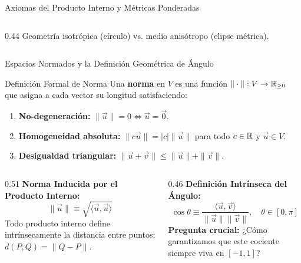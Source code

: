 \documentclass[10pt,aspectratio=169]{beamer}
\begin{document}
\begin{frame}{Axiomas del Producto Interno y Métricas Ponderadas}
\begin{columns}[c]
\begin{column}{0.44\textwidth}
      {\scriptsize Geometría isotrópica (círculo) vs. medio anisótropo (elipse métrica).}
    \end{column}
  \end{columns}
\end{frame}

\begin{frame}{Espacios Normados y la Definición Geométrica de Ángulo}
  \begin{block}{Definición Formal de Norma}
    \footnotesize
    Una \textbf{norma} en $V$ es una función $\|\cdot\|: V \to \mathbb{R}_{\ge 0}$ que asigna a cada vector su longitud satisfaciendo:
    \begin{enumerate}
      \itemsep1pt
      \item \textbf{No-degeneración:} $\|\vec{u}\| = 0 \iff \vec{u} = \vec{0}$.
      \item \textbf{Homogeneidad absoluta:} $\|c\vec{u}\| = |c|\|\vec{u}\|$ para todo $c \in \mathbb{R}$ y $\vec{u} \in V$.
      \item \textbf{Desigualdad triangular:} $\|\vec{u} + \vec{v}\| \le \|\vec{u}\| + \|\vec{v}\|$.
    \end{enumerate}
  \end{block}
  \vspace{0.08cm}
  \begin{columns}[c]
    \begin{column}{0.51\textwidth}
      \footnotesize
      \textbf{Norma Inducida por el Producto Interno:}
      \[
      \boxed{\|\vec{u}\| \equiv \sqrt{\langle \vec{u}, \vec{u} \rangle}}
      \]
      Todo producto interno define intrínsecamente la distancia entre puntos: $d(P, Q) = \|Q - P\|$.
    \end{column}
    \begin{column}{0.46\textwidth}
      \footnotesize
      \textbf{Definición Intrínseca del Ángulo:}
      \[
      \boxed{\cos\theta \equiv \frac{\langle \vec{u}, \vec{v} \rangle}{\|\vec{u}\|\|\vec{v}\|}, \quad \theta \in [0, \pi]}
      \]
      \textbf{Pregunta crucial:} ¿Cómo garantizamos que este cociente siempre viva en $[-1, 1]$?
    \end{column}
  \end{columns}
\end{frame}
\end{document}
